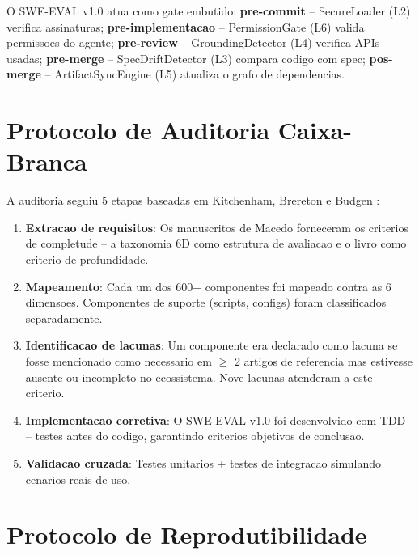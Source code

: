 \documentclass[12pt,a4paper,oneside,sumario=tradicional,chapter=TITLE,section=TITLE,subsection=TITLE,english,brazil]{abntex2}
\begin{document}
O SWE-EVAL v1.0 atua como gate embutido: \textbf{pre-commit} -- SecureLoader (L2) verifica assinaturas; \textbf{pre-implementacao} -- PermissionGate (L6) valida permissoes do agente; \textbf{pre-review} -- GroundingDetector (L4) verifica APIs usadas; \textbf{pre-merge} -- SpecDriftDetector (L3) compara codigo com spec; \textbf{pos-merge} -- ArtifactSyncEngine (L5) atualiza o grafo de dependencias.

\section{Protocolo de Auditoria Caixa-Branca}

A auditoria seguiu 5 etapas baseadas em Kitchenham, Brereton e Budgen \cite{kitchenham2009systematic}:

\begin{enumerate}[leftmargin=*]
  \item \textbf{Extracao de requisitos}: Os manuscritos de Macedo forneceram os criterios de completude -- a taxonomia 6D \cite{macedo2026fromprompt} como estrutura de avaliacao e o livro \cite{macedo2026engenharia} como criterio de profundidade.
  \item \textbf{Mapeamento}: Cada um dos 600+ componentes foi mapeado contra as 6 dimensoes. Componentes de suporte (scripts, configs) foram classificados separadamente.
  \item \textbf{Identificacao de lacunas}: Um componente era declarado como lacuna se fosse mencionado como necessario em $\geq$ 2 artigos de referencia mas estivesse ausente ou incompleto no ecossistema. Nove lacunas atenderam a este criterio.
  \item \textbf{Implementacao corretiva}: O SWE-EVAL v1.0 foi desenvolvido com TDD -- testes antes do codigo, garantindo criterios objetivos de conclusao.
  \item \textbf{Validacao cruzada}: Testes unitarios + testes de integracao simulando cenarios reais de uso.
\end{enumerate}

\section{Protocolo de Reprodutibilidade}
\end{document}
